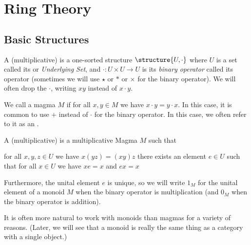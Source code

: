 
\chapter{Ring Theory}

\section{Basic Structures}

\begin{definition}[Magmas]
A (multiplicative)  is a one-sorted structure
$\structure{U, \cdot}$ where $U$ is a set called its 
or \emph{Underlying Set}, and $\cdot\colon U\times U\to U$ is its
\emph{binary operator} called its  operator
(sometimes we will use $\star$ or $*$ or $\times$ for the binary
operator). We will often drop the $\cdot$, writing $xy$ instead of
$x\cdot y$.

We call a magma $M$  if for all $x,y\in M$ we have
$x\cdot y=y\cdot x$. In this case, it is common to use $+$ instead of
$\cdot$ for the binary operator. In this case, we often refer to it as
an .
\end{definition}

\begin{definition}[Monoids]\label{defn:monoid}
A (multiplicative)  is a multiplicative Magma $M$ such that
\begin{itemize}
 for all $x,y,z\in U$ we have $x(yz)=(xy)z$
 there exists an element $e\in U$ such that for all
  $x\in U$ we have $xe=x$ and $ex=x$
\end{itemize}
Furthermore, the unital element $e$ is unique, so we will write
$1_{M}$ for the unital element of a monoid $M$ when the binary
operator is multiplication (and $0_{M}$ when the binary operator is
addition). 

It is often more natural to work with monoids than magmas for a
variety of reasons. (Later, we will see that a monoid is really the
same thing as a category with a single object.)
\end{definition}

